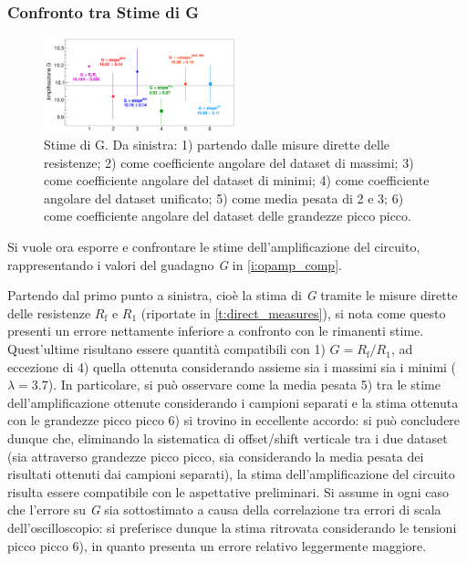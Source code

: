 \documentclass[a4paper,11pt]{article} %
\begin{document}

\subsubsection{Confronto tra Stime di G}

\begin{figure}
	\centering
	\includegraphics[width=0.5\textwidth]{../Plots/Report_Plots/opamp_comp_BIG.png}
	\caption{\footnotesize Stime di G. Da sinistra: 1) partendo dalle misure dirette delle resistenze; 2) come
	coefficiente angolare del dataset di massimi; 3) come coefficiente angolare del dataset di minimi; 4) come
	coefficiente angolare del dataset unificato; 5) come media pesata di 2 e 3; 6) come coefficiente angolare del
	dataset delle grandezze picco picco.}
	\label{i:opamp_comp}
\end{figure}

Si vuole ora esporre e confrontare le stime dell'amplificazione del circuito, rappresentando i valori del guadagno
\textit{G} in \autoref{i:opamp_comp}.



\noindent Partendo dal primo punto a sinistra, cioè la stima di \textit{G} tramite le misure dirette delle resistenze
$R_{\text{f}}$ e $R_{1}$ (riportate in \autoref{t:direct_measures}), si nota come questo presenti un errore nettamente
inferiore a confronto con le rimanenti stime. Quest'ultime risultano essere quantità compatibili con 1)
$G=R_{\text{f}}/R_{1}$, ad eccezione di 4) quella ottenuta considerando assieme sia i massimi sia i minimi ($\lambda =
3.7$). In particolare, si può osservare come la media pesata 5) tra le stime dell'amplificazione ottenute considerando i
campioni separati e la stima ottenuta con le grandezze picco picco 6) si trovino in eccellente accordo: si può concludere
dunque che, eliminando la sistematica di offset/shift verticale tra i due dataset (sia attraverso grandezze picco picco,
sia considerando la media pesata dei risultati ottenuti dai campioni separati), la stima dell'amplificazione del
circuito risulta essere compatibile con le aspettative preliminari. Si assume in ogni caso che l'errore su \textit{G}
sia sottostimato a causa della correlazione tra errori di scala dell'oscilloscopio: si preferisce dunque la stima
ritrovata considerando le tensioni picco picco 6), in quanto presenta un errore relativo leggermente maggiore.
\end{document}
